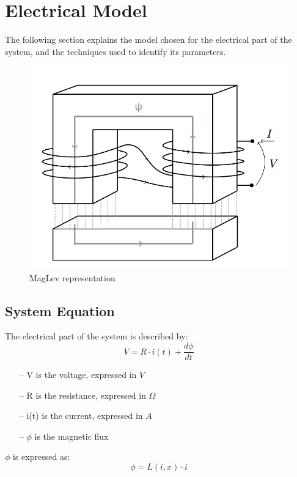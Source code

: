 \documentclass[a4paper, 11pt] {article}
\begin{document}
\section{Electrical Model}
The following section explains the model chosen for the electrical part of the system, and the techniques used to identify its parameters.
\begin{figure}[H]
\begin{center}
\includegraphics[scale=0.5]{Images/2_schema_elettrico}
\end{center}
\caption{MagLev representation}
\end{figure}


\subsection{System Equation}
The electrical part of the system is described by:
\begin{equation}
V = R \cdot i(t) + \frac{d \phi}{dt}
\end{equation}

\begin{itemize}
\item[--] V is the voltage, expressed in $V$
\item[--] R is the resistance, expressed in $\Omega$
\item[--] i(t) is the current, expressed in $A$
\item[--] $\phi$ is the magnetic flux
\end{itemize}

$\phi$ is expressed as: 
\begin{equation}
\phi = L(i,x) \cdot i
\end{equation}
\end{document}
